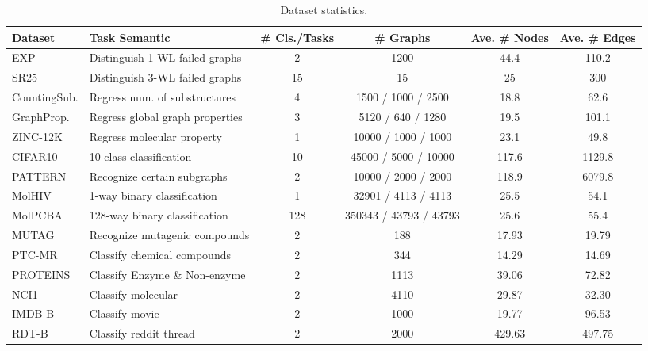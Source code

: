 \begin{table}[h!]
\fontsize{8.7}{9.2}\selectfont
 \setlength{\tabcolsep}{1pt}
    \caption{Dataset statistics.}\label{tab:data-semantics}
    \centering
    \begin{tabular}{llcccc}
    \toprule
    Dataset & Task Semantic & \# Cls./Tasks & \# Graphs & Ave. \# Nodes & Ave. \# Edges  \\
    \midrule  
    EXP  & Distinguish 1-WL failed graphs & 2  & 1200 & 44.4 & 110.2\\
    SR25 & Distinguish 3-WL failed graphs & 15 & 15   & 25   & 300\\
    \midrule
    CountingSub. & Regress num. of substructures   & 4& 1500 / 1000 / 2500& 18.8 & 62.6\\
    GraphProp.   & Regress global graph properties & 3& 5120 / 640 / 1280 & 19.5 & 101.1 \\
    \midrule
    ZINC-12K  & Regress molecular property    & 1  & 10000 / 1000 / 1000& 23.1 & 49.8\\
    CIFAR10   & 10-class classification          & 10 & 45000 / 5000 / 10000& 117.6 & 1129.8 \\
    PATTERN   & Recognize certain subgraphs   & 2  & 10000 / 2000 / 2000& 118.9 & 6079.8\\
    \midrule
    MolHIV    & 1-way binary classification   & 1  & 32901 / 4113 / 4113& 25.5 & 54.1\\
    MolPCBA   & 128-way binary classification & 128 & 350343 / 43793 / 43793 & 25.6 & 55.4 \\
    \midrule  
    MUTAG     & Recognize mutagenic compounds & 2 & 188 & 	17.93 & 19.79\\
    PTC-MR    & Classify chemical compounds & 2 & 344 & 14.29 & 14.69 \\
    PROTEINS  & Classify Enzyme \& Non-enzyme & 2 & 1113 & 39.06 & 72.82\\
    NCI1      & Classify molecular & 2 & 4110 & 29.87 & 32.30 \\
    IMDB-B    & Classify movie & 2 & 1000 & 19.77 & 96.53\\
    RDT-B  & Classify reddit thread & 2 & 2000 & 429.63 & 497.75 \\
    \bottomrule
    \end{tabular}
\end{table}

